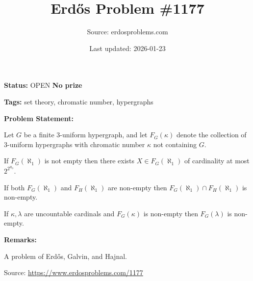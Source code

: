 \documentclass{article}
\title{Erd\H{o}s Problem \#1177}
\date{Last updated: 2026-01-23}
\author{Source: erdosproblems.com}
\begin{document}
\maketitle

\noindent\textbf{Status:} OPEN \quad \textbf{No prize}

\noindent\textbf{Tags:} set theory, chromatic number, hypergraphs

\medskip
\noindent\textbf{Problem Statement:}

Let $G$ be a finite $3$-uniform hypergraph, and let $F_G(\kappa)$ denote the collection of $3$-uniform hypergraphs with chromatic number $\kappa$ not containing $G$.

If $F_G(\aleph_1)$ is not empty then there exists $X\in F_G(\aleph_1)$ of cardinality at most $2^{2^{\aleph_0}}$.

If both $F_G(\aleph_1)$ and $F_H(\aleph_1)$ are non-empty then $F_G(\aleph_1)\cap F_H(\aleph_1)$ is non-empty.

If $\kappa,\lambda$ are uncountable cardinals and $F_G(\kappa)$ is non-empty then $F_G(\lambda)$ is non-empty.

\bigskip
\noindent\textbf{Remarks:}

A problem of Erd\H{o}s, Galvin, and Hajnal.

\bigskip
\noindent\small{Source: \url{https://www.erdosproblems.com/1177}}
\end{document}
